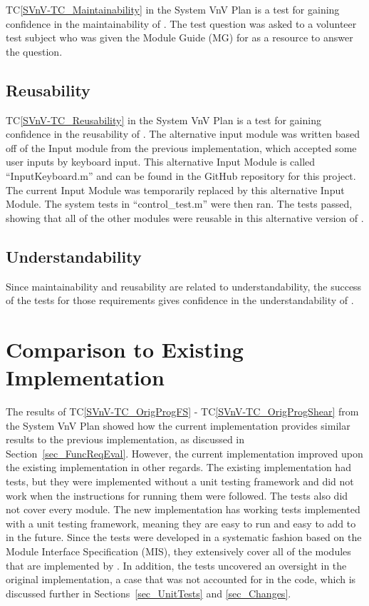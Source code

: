 \documentclass[12pt, titlepage]{article}
\newcommand{\tcref}[1]{TC\ref{#1}}
\begin{document}
\tcref{SVnV-TC_Maintainability} in the System VnV Plan is a test for gaining 
confidence in the maintainability of \progname{}. The test question was asked 
to a volunteer test subject who was given the Module Guide (MG) for \progname{} 
as a resource to answer the question.
		
\subsection{Reusability}

\tcref{SVnV-TC_Reusability} in the System VnV Plan is a test for gaining 
confidence in the reusability of \progname{}. The alternative input module was 
written based off of the Input module from the previous implementation, which 
accepted some user inputs by keyboard input. This alternative Input Module is 
called ``InputKeyboard.m'' and can be found in the GitHub repository for this 
project. The current Input Module was temporarily replaced by this alternative 
Input Module. The system tests in ``control\_test.m'' were then ran. The tests 
passed, showing that all of the other modules were reusable in this alternative 
version of \progname{}.

\subsection{Understandability}
Since maintainability and reusability are related to understandability, the 
success of the tests for those requirements gives confidence in the 
understandability of \progname{}.
	
\section{Comparison to Existing Implementation} \label{sec_Comparison}

The results of \tcref{SVnV-TC_OrigProgFS} - \tcref{SVnV-TC_OrigProgShear} from 
the System VnV Plan showed how the current implementation provides similar 
results to the previous implementation, as discussed in 
Section~\ref{sec_FuncReqEval}. However, the current implementation improved 
upon the existing implementation in other regards. The existing implementation 
had tests, but they were implemented without a unit testing framework and did 
not work when the instructions for running them were followed. The tests also 
did not cover every module. The new implementation has working tests 
implemented with a unit testing framework, meaning they are easy to run and 
easy to add to in the future. Since the tests were developed in a systematic 
fashion based on the Module Interface Specification (MIS), they extensively 
cover all of the modules that are implemented by \progname{}. In addition, the 
tests uncovered an oversight in the original implementation, a case that was 
not accounted for in the code, which is discussed further in 
Sections~\ref{sec_UnitTests} and \ref{sec_Changes}.
\end{document}
